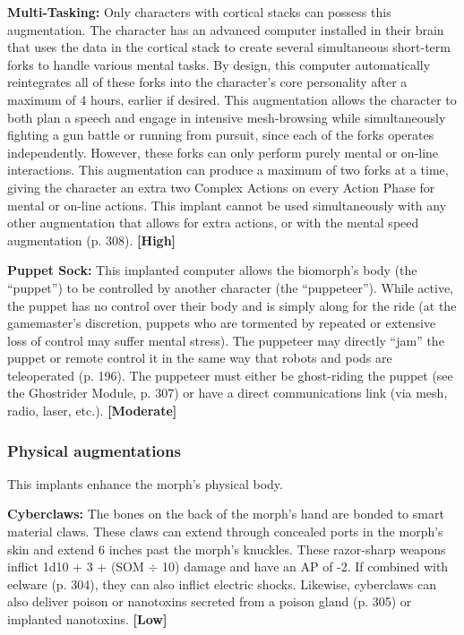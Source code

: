 \textbf{Multi-Tasking:} Only characters with cortical stacks can possess this augmentation. The character has an advanced computer installed in their brain that uses the data in the cortical stack to create several simultaneous short-term forks to handle various mental tasks. By design, this computer automatically reintegrates all of these forks into the character’s core personality after a maximum of 4 hours, earlier if desired. This augmentation allows the character to both plan a speech and engage in intensive mesh-browsing while simultaneously fighting a gun battle or running from pursuit, since each of the forks operates independently. However, these forks can only perform purely mental or on-line interactions. This augmentation can produce a maximum of two forks at a time, giving the character an extra two Complex Actions on every Action Phase for mental or on-line actions. This implant cannot be used simultaneously with any other augmentation that allows for extra actions, or with the mental speed augmentation (p. 308). \textbf{[High]} 

\textbf{Puppet Sock:} This implanted computer allows the biomorph’s body (the ``puppet'') to be controlled by another character (the ``puppeteer''). While active, the puppet has no control over their body and is simply along for the ride (at the gamemaster’s discretion, puppets who are tormented by repeated or extensive loss of control may suffer mental stress). The puppeteer may directly ``jam'' the puppet or remote control it in the same way that robots and pods are teleoperated (p. 196). The puppeteer must either be ghost-riding the puppet (see the Ghostrider Module, p. 307) or have a direct communications link (via mesh, radio, laser, etc.). \textbf{[Moderate]} 

\subsubsection{Physical augmentations} 

This implants enhance the morph’s physical body. 

\textbf{Cyberclaws:} The bones on the back of the morph’s hand are bonded to smart material claws. These claws can extend through concealed ports in the morph’s skin and extend 6 inches past the morph’s knuckles. These razor-sharp weapons inflict 1d10 + 3 + (SOM $\div$ 10) damage and have an AP of -2. If combined with eelware (p. 304), they can also inflict electric shocks. Likewise, cyberclaws can also deliver poison or nanotoxins secreted from a poison gland (p. 305) or implanted nanotoxins. \textbf{[Low]} 

